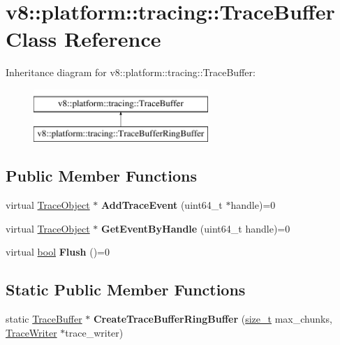 \hypertarget{classv8_1_1platform_1_1tracing_1_1TraceBuffer}{}\section{v8\+:\+:platform\+:\+:tracing\+:\+:Trace\+Buffer Class Reference}
\label{classv8_1_1platform_1_1tracing_1_1TraceBuffer}
Inheritance diagram for v8\+:\+:platform\+:\+:tracing\+:\+:Trace\+Buffer\+:\begin{figure}[H]
\begin{center}
\leavevmode
\includegraphics[height=2.000000cm]{classv8_1_1platform_1_1tracing_1_1TraceBuffer}
\end{center}
\end{figure}
\subsection*{Public Member Functions}
\begin{DoxyCompactItemize}
\item 
\mbox{\label{classv8_1_1platform_1_1tracing_1_1TraceBuffer_a0680714161394e7b93cf2ac32f3d6b72}} 
virtual \mbox{\hyperlink{classv8_1_1platform_1_1tracing_1_1TraceObject}{Trace\+Object}} $\ast$ {\bfseries Add\+Trace\+Event} (uint64\+\_\+t $\ast$handle)=0
\item 
\mbox{\label{classv8_1_1platform_1_1tracing_1_1TraceBuffer_a9749c2155f2c483625d0242d9a7eb0ec}} 
virtual \mbox{\hyperlink{classv8_1_1platform_1_1tracing_1_1TraceObject}{Trace\+Object}} $\ast$ {\bfseries Get\+Event\+By\+Handle} (uint64\+\_\+t handle)=0
\item 
\mbox{\label{classv8_1_1platform_1_1tracing_1_1TraceBuffer_ad16dbfbda98253565b3af122e60aa636}} 
virtual \mbox{\hyperlink{classbool}{bool}} {\bfseries Flush} ()=0
\end{DoxyCompactItemize}
\subsection*{Static Public Member Functions}
\begin{DoxyCompactItemize}
\item 
\mbox{\label{classv8_1_1platform_1_1tracing_1_1TraceBuffer_a470a0bf66ee97337ac700de9e39c8942}} 
static \mbox{\hyperlink{classv8_1_1platform_1_1tracing_1_1TraceBuffer}{Trace\+Buffer}} $\ast$ {\bfseries Create\+Trace\+Buffer\+Ring\+Buffer} (\mbox{\hyperlink{classsize__t}{size\+\_\+t}} max\+\_\+chunks, \mbox{\hyperlink{classv8_1_1platform_1_1tracing_1_1TraceWriter}{Trace\+Writer}} $\ast$trace\+\_\+writer)
\end{DoxyCompactItemize}
